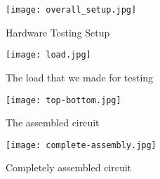 \begin{figure}[H]
    \centering
    \texttt{[image: overall\_setup.jpg]}
    \caption{Hardware Testing Setup}
    \label{fig:overall_setup}
\end{figure}

\begin{figure}[H]
    \centering
    \texttt{[image: load.jpg]}
    \caption{The load that we made for testing}
    \label{fig:load}
\end{figure}

\begin{figure}[H]
    \centering
    \texttt{[image: top-bottom.jpg]}
    \caption{The assembled circuit}
    \label{fig:top-bottom}
\end{figure}

\begin{figure}[H]
    \centering
    \texttt{[image: complete-assembly.jpg]}
    \caption{Completely assembled circuit}
    \label{fig:complete-assembly}
\end{figure}

